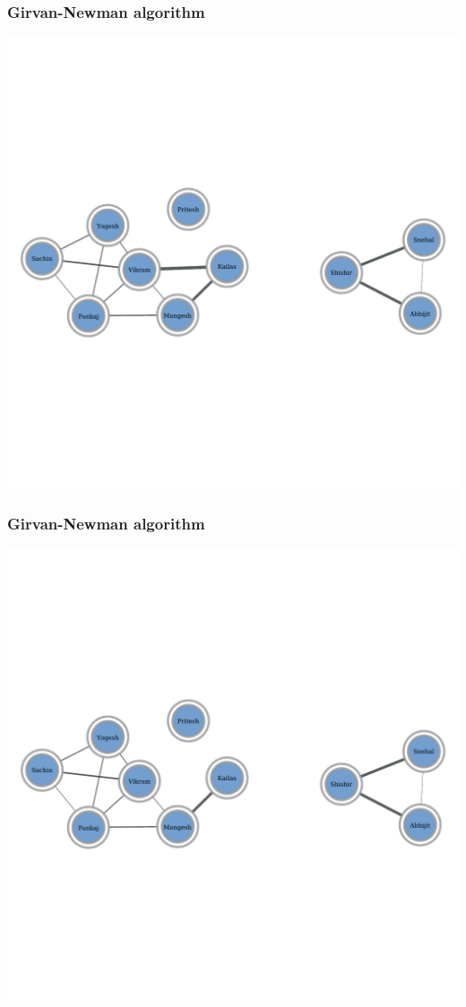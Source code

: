 \documentclass{beamer}
\begin{document}
\begin{frame}
    \frametitle{Girvan-Newman algorithm}
    \centering
    \includegraphics[width=0.8\columnwidth]{gn4.pdf}
\end{frame}
\begin{frame}
    \frametitle{Girvan-Newman algorithm}
    \centering
    \includegraphics[width=0.8\columnwidth]{gn5.pdf}
\end{frame}
\end{document}
